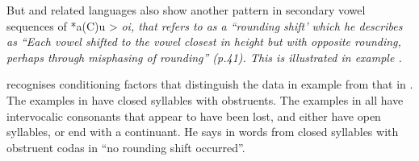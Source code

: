 But 
and related languages also show another pattern in secondary
vowel sequences of *a(C)u > \it{oi},
that \citet[41ff]{Collins1983} refers to as a “rounding shift’
which he describes as “Each vowel shifted to the vowel closest
in height but with opposite rounding,
perhaps through misphasing of rounding” (p.41).
This is illustrated in example .
\mbox{}\\


\citet[42]{Collins1983} recognises conditioning factors that
distinguish the data in example  from that in .
The examples in  have closed syllables with obstruents.
The examples in  all have intervocalic consonants that
appear to have been lost,
and either have open syllables,
or end with a continuant.
He says in words from closed syllables with obstruent codas in
 “no rounding shift occurred”.

